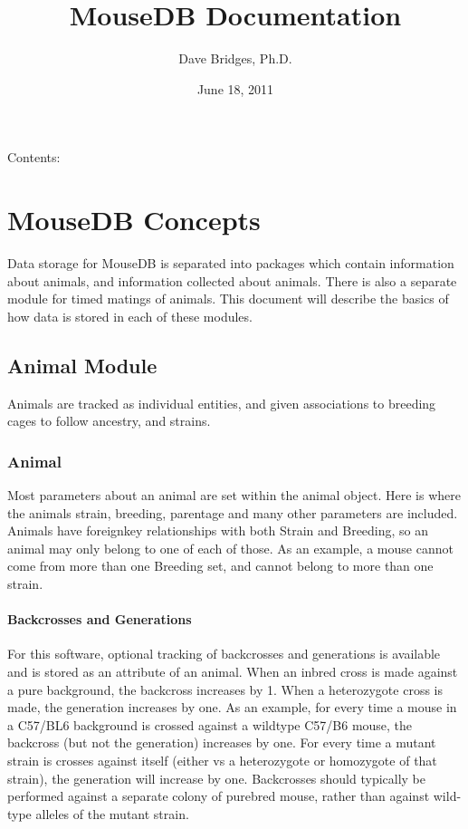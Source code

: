 \documentclass[letterpaper,10pt,english]{sphinxmanual}
\title{MouseDB Documentation}
\date{June 18, 2011}
\author{Dave Bridges, Ph.D.}
\begin{document}
\maketitle
\tableofcontents
{}\label{index::doc}


Contents:


\chapter{MouseDB Concepts}
\label{concepts:welcome-to-mousedb-s-documentation}\label{concepts::doc}\label{concepts:mousedb-concepts}
Data storage for MouseDB is separated into packages which contain information about animals, and information collected about animals.  There is also a separate module for timed matings of animals.  This document will describe the basics of how data is stored in each of these modules.


\section{Animal Module}
\label{concepts:animal-module}
Animals are tracked as individual entities, and given associations to breeding cages to follow ancestry, and strains.


\subsection{Animal}
\label{concepts:animal}
Most parameters about an animal are set within the animal object.  Here is where the animals strain, breeding, parentage and many other parameters are included.  Animals have foreignkey relationships with both Strain and Breeding, so an animal may only belong to one of each of those.  As an example, a mouse cannot come from more than one Breeding set, and cannot belong to more than one strain.


\subsubsection{Backcrosses and Generations}
\label{concepts:backcrosses-and-generations}
For this software, optional tracking of backcrosses and generations is available and is stored as an attribute of an animal.  When an inbred cross is made against a pure background, the backcross increases by 1.  When a heterozygote cross is made, the generation increases by one.  As an example, for every time a mouse in a C57/BL6 background is crossed against a wildtype C57/B6 mouse, the backcross (but not the generation) increases by one.  For every time a mutant strain is crosses against itself (either vs a heterozygote or homozygote of that strain), the generation will increase by one.  Backcrosses should typically be performed against a separate colony of purebred mouse, rather than against wild-type alleles of the mutant strain.
\end{document}
